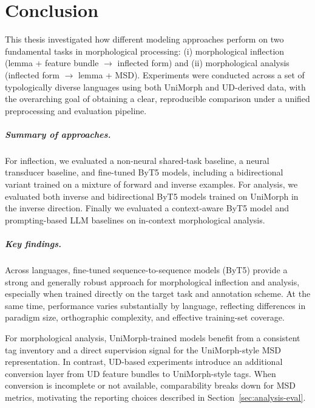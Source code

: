 \chapter{Conclusion}\label{chapter:conclusion}

This thesis investigated how different modeling approaches perform on two fundamental tasks in morphological processing: (i) morphological inflection (lemma + feature bundle $\rightarrow$ inflected form) and (ii) morphological analysis (inflected form $\rightarrow$ lemma + \ac{MSD}). Experiments were conducted across a set of typologically diverse languages using both UniMorph and \ac{UD}-derived data, with the overarching goal of obtaining a clear, reproducible comparison under a unified preprocessing and evaluation pipeline.

\paragraph{Summary of approaches.}
For inflection, we evaluated a non-neural shared-task baseline, a neural transducer baseline, and fine-tuned ByT5 models, including a bidirectional variant trained on a mixture of forward and inverse examples. For analysis, we evaluated both inverse and bidirectional ByT5 models trained on UniMorph in the inverse direction. Finally we evaluated a context-aware ByT5 model and prompting-based LLM baselines on in-context morphological analysis. 

\paragraph{Key findings.}
Across languages, fine-tuned sequence-to-sequence models (ByT5) provide a strong and generally robust approach for morphological inflection and analysis, especially when trained directly on the target task and annotation scheme. At the same time, performance varies substantially by language, reflecting differences in paradigm size, orthographic complexity, and effective training-set coverage.

For morphological analysis, UniMorph-trained models benefit from a consistent tag inventory and a direct supervision signal for the UniMorph-style \ac{MSD} representation. In contrast, \ac{UD}-based experiments introduce an additional conversion layer from \ac{UD} feature bundles to UniMorph-style tags. When conversion is incomplete or not available, comparability breaks down for \ac{MSD} metrics, motivating the reporting choices described in Section~\ref{sec:analysis-eval}.

